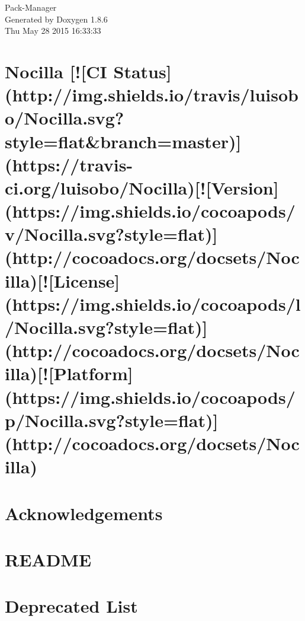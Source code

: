 \documentclass[twoside]{book}
\newcommand{\clearemptydoublepage}{%
  \newpage{\pagestyle{empty}\cleardoublepage}%
}
\begin{document}
\hypersetup{pageanchor=false}
\begin{titlepage}
\vspace*{7cm}
\begin{center}%
{\Large Pack-\/\-Manager }\\
\vspace*{1cm}
{\large Generated by Doxygen 1.8.6}\\
\vspace*{0.5cm}
{\small Thu May 28 2015 16:33:33}\\
\end{center}
\end{titlepage}
\clearemptydoublepage
\tableofcontents
\clearemptydoublepage
{}
\hypersetup{pageanchor=true}

\chapter{Nocilla \mbox{[}!\mbox{[}C\-I Status\mbox{]}(http\-://img.shields.\-io/travis/luisobo/\-Nocilla.svg?style=flat\&branch=master)\mbox{]}(https\-://travis-\/ci.org/luisobo/\-Nocilla)\mbox{[}!\mbox{[}Version\mbox{]}(https\-://img.shields.\-io/cocoapods/v/\-Nocilla.svg?style=flat)\mbox{]}(http\-://cocoadocs.org/docsets/\-Nocilla)\mbox{[}!\mbox{[}License\mbox{]}(https\-://img.shields.\-io/cocoapods/l/\-Nocilla.svg?style=flat)\mbox{]}(http\-://cocoadocs.org/docsets/\-Nocilla)\mbox{[}!\mbox{[}Platform\mbox{]}(https\-://img.shields.\-io/cocoapods/p/\-Nocilla.svg?style=flat)\mbox{]}(http\-://cocoadocs.org/docsets/\-Nocilla)}
\label{md__pods__nocilla__r_e_a_d_m_e}
\hypertarget{md__pods__nocilla__r_e_a_d_m_e}{}

\chapter{Acknowledgements}
\label{md__pods__target__support__files__pods__pods-acknowledgements}
\hypertarget{md__pods__target__support__files__pods__pods-acknowledgements}{}

\chapter{R\-E\-A\-D\-M\-E}
\label{md__r_e_a_d_m_e}
\hypertarget{md__r_e_a_d_m_e}{}

\chapter{Deprecated List}
\label{deprecated}
\hypertarget{deprecated}{}

\end{document}
